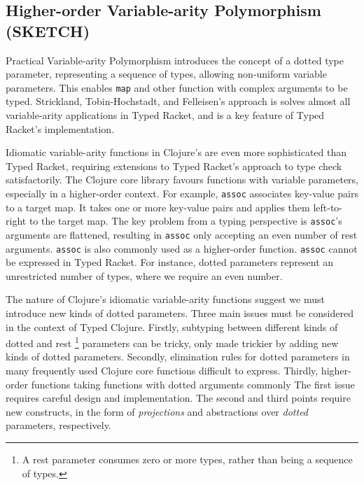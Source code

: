 \subsection{Higher-order Variable-arity Polymorphism (SKETCH)}

Practical Variable-arity Polymorphism introduces the concept of a dotted type parameter,
representing a sequence of types, allowing non-uniform variable parameters.
This enables \lstinline|map| and other function with complex arguments to be typed.
Strickland, Tobin-Hochstadt, and Felleisen's approach is solves almost all variable-arity applications in
Typed Racket, and is a key feature of Typed Racket's implementation.

Idiomatic variable-arity functions in Clojure's are even more sophisticated than Typed Racket, requiring extensions
to Typed Racket's approach to type check satisfactorily. The Clojure core library favours functions with
variable parameters, especially in a higher-order context. For example, \lstinline|assoc|
associates key-value pairs to a target map. It takes one or more key-value pairs and
applies them left-to-right to the target map. The key problem from a typing perspective
is \lstinline|assoc|'s arguments are flattened, resulting in \lstinline|assoc| only
accepting an even number of rest arguments. \lstinline|assoc| is also commonly used as a
higher-order function.
\lstinline|assoc| cannot be expressed in Typed Racket. For instance,
dotted parameters represent an unrestricted number of types, where we require an even number.

The nature of Clojure's idiomatic variable-arity functions suggest we must introduce
new kinds of dotted parameters. Three main issues must be considered in the context of Typed Clojure.
Firstly, subtyping between different kinds of dotted and rest
\footnote{A rest parameter consumes zero or more types, rather than being a sequence of types.}
parameters can be tricky, only made trickier by adding new kinds of dotted parameters.
Secondly, elimination rules for dotted parameters in many frequently used Clojure core functions
difficult to express.
Thirdly, higher-order functions taking functions with dotted arguments commonly 
The first issue requires careful design and implementation.
The second and third points require new constructs, in the form of \emph{projections}
and abstractions over \emph{dotted} parameters, respectively.



